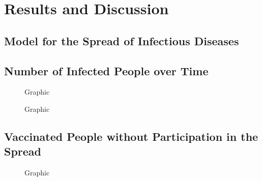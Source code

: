\section{Results and Discussion}

\subsection{Model for the Spread of Infectious Diseases}

\subsection{Number of Infected People over Time}


\begin{figure}[ht]
    \centering
    \resizebox{\textwidth}{!}{}
    \caption{Graphic}\label{fig:Res_Dis_Avg_Inf_over_p1}
\end{figure}


\begin{figure}[ht]
    \centering
    \resizebox{\textwidth}{!}{}
    \caption{Graphic}\label{fig:Res_Dis_Avg_Inf_over_p1_L96}
\end{figure}

\subsection{Vaccinated People without Participation in the Spread}

\begin{figure}[ht]
    \centering
    \resizebox{\textwidth}{!}{}
    \caption{Graphic}\label{fig:Res_Dis_Avg_Inf_over_p4}
\end{figure}